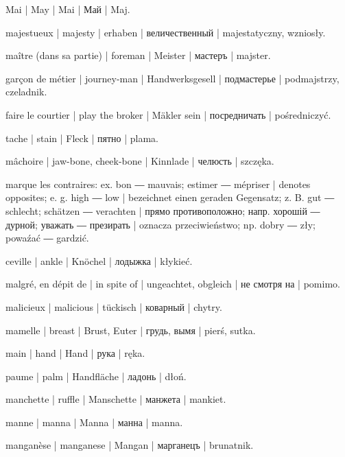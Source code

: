 \begin{outdent}{1em}
Mai | May | Mai | Май | Maj.

majestueux | majesty | erhaben | величественный | majestatyczny, wzniosły.

maître (dans sa partie) | foreman | Meister | мастеръ | majster.

\uvsubentry{}
garçon de métier | journey-man | Handwerksgesell | подмастерье | podmajstrzy, czeladnik.

faire le courtier | play the broker | Mäkler sein | посредничать | pośredniczyć.

tache | stain | Fleck | пятно | plama.

mâchoire | jaw-bone, cheek-bone | Kinnlade | челюсть | szczęka.

marque les contraires: ex.  bon ―  mauvais;
 estimer ―  mépriser | denotes opposites;
e. g.  high ―  low | bezeichnet einen geraden
Gegensatz; z. B.  gut ―  schlecht;  schätzen
―  verachten | прямо противоположно; напр. 
хорошій ―  дурной;  уважать ― 
презирать | oznacza przeciwieństwo; np.  dobry ― 
zły;  powaźać ―  gardzić.

ceville | ankle | Knöchel | лодыжка | kłykieć.

malgré, en dépit de | in spite of | ungeachtet, obgleich | не смотря на | pomimo.

malicieux | malicious | tückisch | коварный | chytry.

mamelle | breast | Brust, Euter | грудь, вымя | pierś, sutka.

main | hand | Hand | рука | ręka.

\uvsubentry{}
paume | palm | Handfläche | ладонь | dłoń.


\uvsubentry{}
manchette | ruffle | Manschette | манжета | mankiet.

manne | manna | Manna | манна | manna.

manganèse | manganese | Mangan | марганецъ | brunatnik.


\end{outdent}
